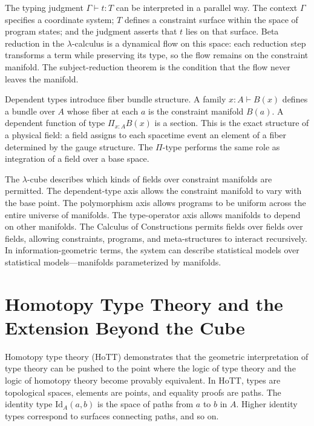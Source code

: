 \documentclass[12pt,a4paper]{article}
\theoremstyle{plain}
\theoremstyle{definition}
\begin{document}
The typing judgment $\Gamma \vdash t : T$ can be interpreted in a parallel way.
The context $\Gamma$ specifies a coordinate system; $T$ defines a constraint
surface within the space of program states; and the judgment asserts that $t$
lies on that surface. Beta reduction in the $\lambda$-calculus is a dynamical
flow on this space: each reduction step transforms a term while preserving its
type, so the flow remains on the constraint manifold. The subject-reduction
theorem is the condition that the flow never leaves the manifold.

Dependent types introduce fiber bundle structure. A family $x : A \vdash B(x)$
defines a bundle over $A$ whose fiber at each $a$ is the constraint manifold
$B(a)$. A dependent function of type $\Pi_{x:A} B(x)$ is a section. This is
the exact structure of a physical field: a field assigns to each spacetime event
an element of a fiber determined by the gauge structure. The $\Pi$-type performs
the same role as integration of a field over a base space.

The $\lambda$-cube describes which kinds of fields over constraint manifolds are
permitted. The dependent-type axis allows the constraint manifold to vary with
the base point. The polymorphism axis allows programs to be uniform across the
entire universe of manifolds. The type-operator axis allows manifolds to depend
on other manifolds. The Calculus of Constructions permits fields over fields
over fields, allowing constraints, programs, and meta-structures to interact
recursively. In information-geometric terms, the system can describe statistical
models over statistical models---manifolds parameterized by manifolds.

\section{Homotopy Type Theory and the Extension Beyond the Cube}
\label{sec:hott}

Homotopy type theory (HoTT) demonstrates that the geometric interpretation of
type theory can be pushed to the point where the logic of type theory and the
logic of homotopy theory become provably equivalent. In HoTT, types are
topological spaces, elements are points, and equality proofs are paths. The
identity type $\mathrm{Id}_A(a, b)$ is the space of paths from $a$ to $b$ in
$A$. Higher identity types correspond to surfaces connecting paths, and so on.
\end{document}
